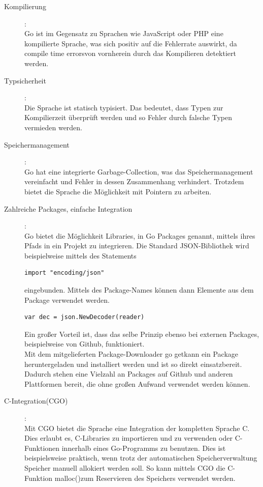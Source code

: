 \documentclass[a4paper,10pt]{scrartcl}
\begin{document}
\begin{description}
\item[Kompilierung]:\\

Go ist im Gegensatz zu Sprachen wie JavaScript oder PHP eine kompilierte Sprache, was sich positiv auf die Fehlerrate auswirkt, da \glqq compile time errors\grqq von vornherein durch das Kompilieren detektiert werden.\\

\item[Typsicherheit]:\\

Die Sprache ist statisch typisiert. Das bedeutet, dass Typen zur Kompilierzeit überprüft werden und so Fehler durch falsche Typen vermieden werden. 

\item[Speichermanagement]:\\

Go hat eine integrierte Garbage-Collection, was das Speichermanagement vereinfacht und Fehler in dessen Zusammenhang verhindert. Trotzdem bietet die Sprache die Möglichkeit mit Pointern zu arbeiten.


\item[Zahlreiche Packages, einfache Integration]:\\

Go bietet die Möglichkeit Libraries, in Go Packages genannt, mittels ihres Pfads in ein Projekt zu integrieren. Die Standard JSON-Bibliothek wird beispielweise mittels des Statements 

\begin{lstlisting}
import "encoding/json"
\end{lstlisting}

eingebunden. Mittels des Package-Names können dann Elemente aus dem Package verwendet werden.


\begin{lstlisting}
var dec = json.NewDecoder(reader)
\end{lstlisting}

Ein großer Vorteil ist, dass das selbe Prinzip ebenso bei externen Packages, beispielweise von Github, funktioniert.\\
Mit dem mitgelieferten Package-Downloader \glqq go get\grqq kann ein Package heruntergeladen und installiert werden und ist so direkt einsatzbereit. Dadurch stehen eine Vielzahl an Packages auf Github und anderen Plattformen bereit, die ohne großen Aufwand verwendet werden können.

\item[C-Integration(CGO)]:\\

Mit CGO bietet die Sprache eine Integration der kompletten Sprache C. Dies erlaubt es,  C-Libraries zu importieren und zu verwenden oder C-Funktionen innerhalb eines Go-Programms zu benutzen. Dies ist beispielsweise praktisch, wenn trotz der automatischen Speicherverwaltung Speicher manuell allokiert werden soll. So kann mittels CGO die C-Funktion \glqq malloc()\grqq zum Reservieren des Speichers verwendet werden.

\end{description}
\end{document}
